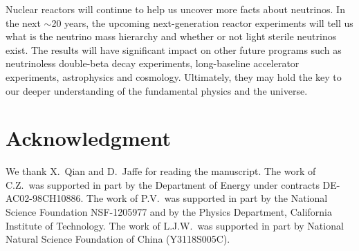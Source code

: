 \documentclass[aps,twocolumn,preprintnumbers,amsmath,superscriptaddress,amssymb,floats,nofootinbib]{revtex4-1}
\begin{document}
Nuclear reactors will continue to help us uncover more facts about neutrinos. In the next $\sim$20 years, the upcoming next-generation reactor experiments will tell us what is the neutrino mass hierarchy and whether or not light sterile neutrinos exist. The results will have significant impact on other future programs such as neutrinoless double-beta decay experiments, long-baseline accelerator experiments, astrophysics and cosmology. Ultimately, they may hold the key to our deeper understanding of the fundamental physics and the universe.

\vspace{12pt}
\section*{Acknowledgment}
We thank X.~Qian and D.~Jaffe for reading the manuscript.
The work of C.Z.~was supported in part by the Department of Energy under contracts DE-AC02-98CH10886.
The work of P.V.~was supported in part by the National Science Foundation NSF-1205977 and by the Physics Department, California Institute of Technology.
The work of L.J.W.~was supported in part by National Natural Science Foundation of China (Y3118S005C).







\end{document}
